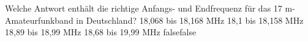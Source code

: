     {Welche Antwort enthält die richtige Anfangs- und Endfrequenz für das 17 m-Amateurfunkband in Deutschland?}
    {18,068 bis 18,168 MHz}
    {18,1 bis 18,158 MHz}
    {18,89 bis 18,99 MHz}
    {18,68 bis 19,99 MHz}
    {false}{false}
